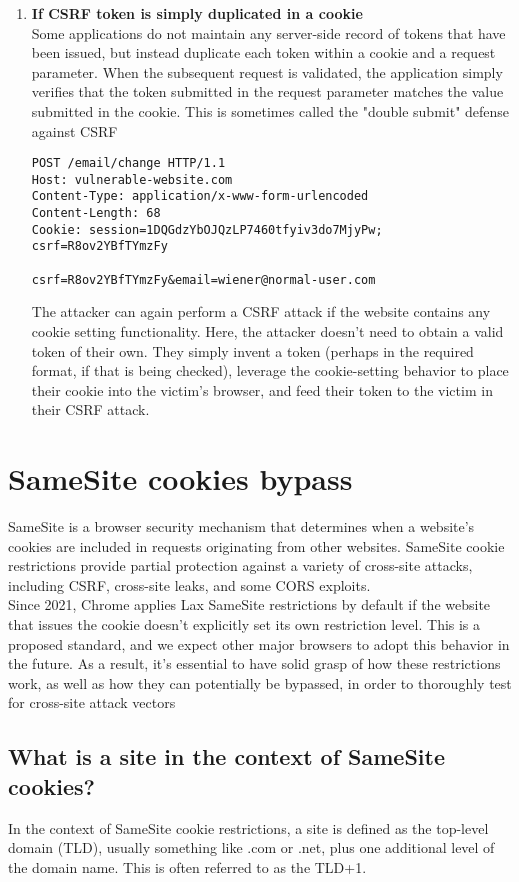 \documentclass{article}
\begin{document}
\begin{enumerate}
\item \textbf{If CSRF token is simply duplicated in a cookie}\\
Some applications do not maintain any server-side record of tokens that have been issued, but instead duplicate each token within a cookie and a request parameter. When the subsequent request is validated, the application simply verifies that the token submitted in the request parameter matches the value submitted in the cookie. This is sometimes called the "double submit" defense against CSRF
			\begin{lstlisting}[frame=single]
POST /email/change HTTP/1.1
Host: vulnerable-website.com
Content-Type: application/x-www-form-urlencoded
Content-Length: 68
Cookie: session=1DQGdzYbOJQzLP7460tfyiv3do7MjyPw; csrf=R8ov2YBfTYmzFy

csrf=R8ov2YBfTYmzFy&email=wiener@normal-user.com
            \end{lstlisting}
The attacker can again perform a CSRF attack if the website contains any cookie setting functionality. Here, the attacker doesn't need to obtain a valid token of their own. They simply invent a token (perhaps in the required format, if that is being checked), leverage the cookie-setting behavior to place their cookie into the victim's browser, and feed their token to the victim in their CSRF attack. 


\end{enumerate}


\section*{SameSite cookies bypass}
 SameSite is a browser security mechanism that determines when a website's cookies are included in requests originating from other websites. SameSite cookie restrictions provide partial protection against a variety of cross-site attacks, including CSRF, cross-site leaks, and some CORS exploits.\\

Since 2021, Chrome applies Lax SameSite restrictions by default if the website that issues the cookie doesn't explicitly set its own restriction level. This is a proposed standard, and we expect other major browsers to adopt this behavior in the future. As a result, it's essential to have solid grasp of how these restrictions work, as well as how they can potentially be bypassed, in order to thoroughly test for cross-site attack vectors

\subsection*{What is a site in the context of SameSite cookies?}
 In the context of SameSite cookie restrictions, a site is defined as the top-level domain (TLD), usually something like .com or .net, plus one additional level of the domain name. This is often referred to as the TLD+1.\\
\end{document}
